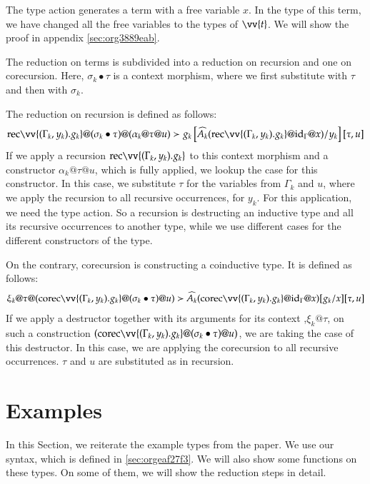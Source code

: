 \documentclass[a4paper,cleardoubleempty,BCOR1cm]{scrbook}
\begin{document}
The type action generates a term with a free variable \(x\).  In the type of
this term, we have changed all the free variables to the types of \(\vv{t}\).
We will show the proof in appendix \ref{sec:org3889eab}.

The reduction on terms  is subdivided into a reduction on recursion and one
on corecursion. Here, \(\sigma_k \bullet\tau\) is a context morphism, where we
first substitute with \(\tau\) and then with \(\sigma_k\).

The reduction on recursion is defined as follows:
\begin{align*}
  \rec \vv{(\Gamma_k,y_k).g_k}@(\sigma_k\bullet\tau)@(\alpha_k@\tau@u)\succ g_k\left[ \widehat{A_k}(\rec\vv{(\Gamma_k,y_k).g_k}@\id{\Gamma}@x)/y_k \right][\tau,u]\\
\end{align*}
If we apply a recursion \(\rec \vv{(\Gamma_k,y_k).g_k}\) to this context
morphism and a constructor \(\alpha_k@\tau@u\), which is fully applied, we
lookup the case for this constructor. In this case, we substitute \(\tau\) for
the variables from \(\Gamma_k\) and \(u\), where we apply the recursion to all
recursive occurrences, for \(y_k\). For this application, we need the type
action. So a recursion is destructing an inductive type and all its recursive
occurrences to another type, while we use different cases for the different
constructors of the type.

On the contrary, corecursion is constructing a coinductive type. It is defined
as follows:
\begin{align*}
  \xi_k@\tau@(\corec \vv{(\Gamma_k,y_k).g_k}@(\sigma_k\bullet\tau)@u)\succ \widehat{A_k}(\corec\vv{(\Gamma_k,y_k).g_k}@\id{\Gamma}@x)[g_k/x] [\tau,u]
\end{align*}
If we apply a destructor together with its arguments for its context
,\(\xi_k@\tau\), on such a construction \((\corec
   \vv{(\Gamma_k,y_k).g_k}@(\sigma_k\bullet\tau)@u)\), we are taking the case of
this destructor. In this case, we are applying the corecursion to all
recursive occurrences. \(\tau\) and \(u\) are substituted as in recursion.

\chapter{Examples}
\label{sec:orga159d18}

In this Section, we reiterate the example types from the paper.  We use our
syntax, which is defined in \ref{sec:orgeaf27f3}.  We will also show some functions
on these types.  On some of them, we will show the reduction steps in detail.
\end{document}
